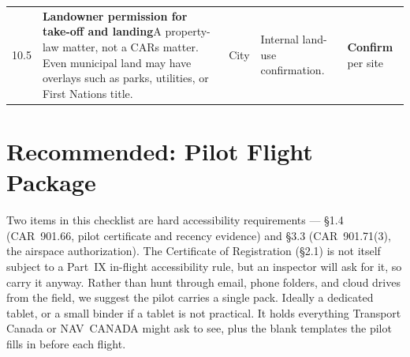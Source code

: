\documentclass[11pt,letterpaper]{article}
\newcommand{\reqcell}[2]{\textbf{#1}\newline\small\color{uavgrey}#2}
\newcommand{\confirm}{\textbf{\color{uavgood!80!black}Confirm}}
\begin{document}
\begin{longtable}{@{}L{0.28in} L{2.20in} L{0.85in} L{1.95in} L{0.85in}@{}}
10.5 &
\reqcell{Landowner permission for take-off and landing}{A property-law matter, not a CARs matter. Even municipal land may have overlays such as parks, utilities, or First Nations title.} &
City & Internal land-use confirmation. & \confirm{} per site \\

\end{longtable}

\section{Recommended: Pilot Flight Package}

Two items in this checklist are hard accessibility requirements ---
\S1.4 (CAR~901.66, pilot certificate and recency evidence) and \S3.3
(CAR~901.71(3), the airspace authorization). The Certificate of
Registration (\S2.1) is not itself subject to a Part~IX in-flight
accessibility rule, but an inspector will ask for it, so carry it
anyway. Rather than hunt
through email, phone folders, and cloud drives from the field, we
suggest the pilot carries a single pack. Ideally a dedicated tablet, or
a small binder if a tablet is not practical. It holds everything
Transport Canada or NAV~CANADA might ask to see, plus the blank
templates the pilot fills in before each flight.
\end{document}
